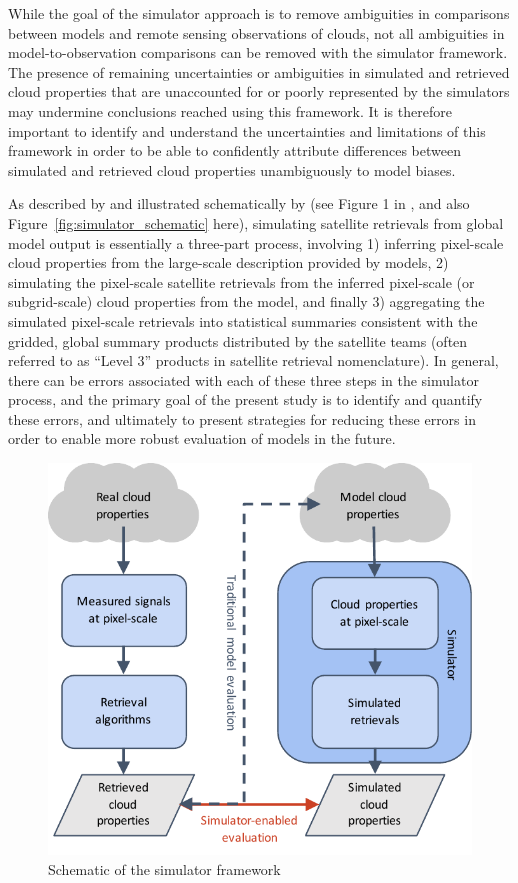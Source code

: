 While the goal of the simulator approach is to remove ambiguities in
comparisons between models and remote sensing observations of clouds,
not all ambiguities in model-to-observation comparisons can be removed
with the simulator framework. The presence of remaining uncertainties or
ambiguities in simulated and retrieved cloud properties that are
unaccounted for or poorly represented by the simulators may undermine
conclusions reached using this framework. It is therefore important to
identify and understand the uncertainties and limitations of this
framework in order to be able to confidently attribute differences
between simulated and retrieved cloud properties unambiguously to model
biases.

As described by \citet{pincus_et_al_2012} and illustrated schematically
by \citet{bodas-salcedo_et_al_2011} (see Figure 1 in
\citet{bodas-salcedo_et_al_2011}, and also
Figure~\ref{fig:simulator_schematic} here), simulating satellite
retrievals from global model output is essentially a three-part process,
involving 1) inferring pixel-scale cloud properties from the large-scale
description provided by models, 2) simulating the pixel-scale satellite
retrievals from the inferred pixel-scale (or subgrid-scale) cloud
properties from the model, and finally 3) aggregating the simulated
pixel-scale retrievals into statistical summaries consistent with the
gridded, global summary products distributed by the satellite teams
(often referred to as ``Level 3'' products in satellite retrieval
nomenclature). In general, there can be errors associated with each of
these three steps in the simulator process, and the primary goal of the
present study is to identify and quantify these errors, and ultimately
to present strategies for reducing these errors in order to enable more
robust evaluation of models in the future.

\begin{figure}[htbp]
\centering
\includegraphics{graphics/simulator_schematic.pdf}
\caption{\label{fig:simulator_schematic}Schematic of the simulator
framework}\label{fig:simulatorux5fschematic}
\end{figure}

